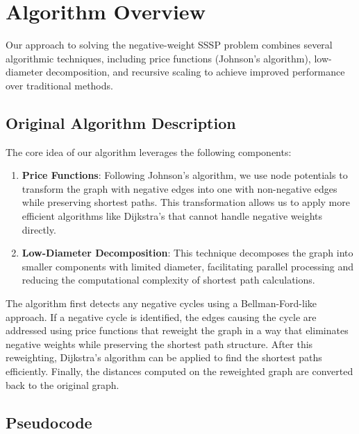 \documentclass[11pt]{article}
\begin{document}
\section{Algorithm Overview}

Our approach to solving the negative-weight SSSP problem combines several algorithmic techniques, including price functions (Johnson's algorithm), low-diameter decomposition, and recursive scaling to achieve improved performance over traditional methods.

\subsection{Original Algorithm Description}

The core idea of our algorithm leverages the following components:

\begin{enumerate}
    \item \textbf{Price Functions}: Following Johnson's algorithm, we use node potentials to transform the graph with negative edges into one with non-negative edges while preserving shortest paths. This transformation allows us to apply more efficient algorithms like Dijkstra's that cannot handle negative weights directly.
    
    \item \textbf{Low-Diameter Decomposition}: This technique decomposes the graph into smaller components with limited diameter, facilitating parallel processing and reducing the computational complexity of shortest path calculations.
    
\end{enumerate}

The algorithm first detects any negative cycles using a Bellman-Ford-like approach. If a negative cycle is identified, the edges causing the cycle are addressed using price functions that reweight the graph in a way that eliminates negative weights while preserving the shortest path structure. After this reweighting, Dijkstra's algorithm can be applied to find the shortest paths efficiently. Finally, the distances computed on the reweighted graph are converted back to the original graph.

\subsection{Pseudocode}
\end{document}
